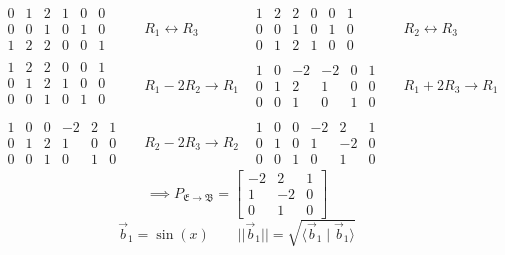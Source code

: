 \documentclass{report}
\begin{document}
$$
\begin{aligned}
&\begin{array}{ccc|ccc}
0&1&2&1&0&0\\
0&0&1&0&1&0\\
1&2&2&0&0&1
\end{array}
&& R_1 \leftrightarrow R_3
\qquad
&\begin{array}{ccc|ccc}
1&2&2&0&0&1\\
0&0&1&0&1&0\\
0&1&2&1&0&0
\end{array}
&& R_2 \leftrightarrow R_3 \\
&\begin{array}{ccc|ccc}
1&2&2&0&0&1\\
0&1&2&1&0&0\\
0&0&1&0&1&0\\
\end{array}
&& R_1 - 2R_2 \rightarrow R_1
&\begin{array}{ccc|ccc}
1&0&-2&-2&0&1\\
0&1&2&1&0&0\\
0&0&1&0&1&0
\end{array}
&& R_1 + 2R_3 \rightarrow R_1\\
&\begin{array}{ccc|ccc}
1&0&0&-2&2&1\\
0&1&2&1&0&0\\
0&0&1&0&1&0
\end{array}
&& R_2 - 2R_3 \rightarrow R_2
&\begin{array}{ccc|ccc}
1&0&0&-2&2&1\\
0&1&0&1&-2&0\\
0&0&1&0&1&0
\end{array}
\end{aligned}
$$
$$
\implies P_{\mathfrak{E}\rightarrow\mathfrak{B}} = \begin{bmatrix}-2&2&1\\1&-2&0\\0&1&0\end{bmatrix}
$$
\pagebreak
{}
\sol
$$
\vec{b}_1 = \sin(x) \qquad ||\vec{b}_1|| = \sqrt{\langle \vec{b}_1 \mid \vec{b}_1 \rangle}
$$
\end{document}
